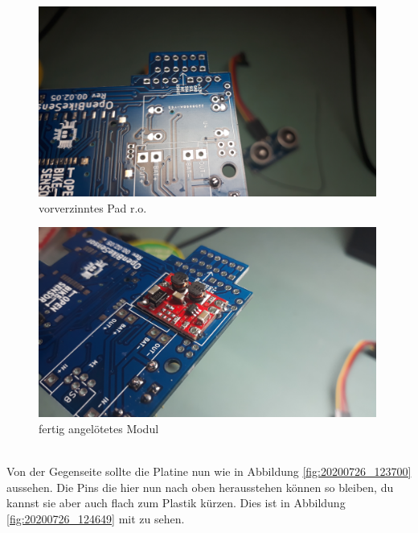 \documentclass[12pt, a4paper]{article}		%
\begin{document}
\begin{minipage}[t]{0.49\textwidth}
\begin{figure}[H]
	\centering
		\includegraphics[width=0.99\textwidth]{Grafiken/20200902_191734.jpg}
	\caption{vorverzinntes Pad r.o.}
	\label{fig:20200726_121444}
\end{figure}
\end{minipage}
\begin{minipage}[t]{0.49\textwidth}
\begin{figure}[H]
	\centering
		\includegraphics[width=0.99\textwidth]{Grafiken/20200902_191918.jpg}
	\caption{fertig angelötetes Modul}
	\label{fig:20200726_121444}
\end{figure}
\end{minipage}
\\ \newline
\newpage
Von der Gegenseite sollte die Platine nun wie in Abbildung \ref{fig:20200726_123700} aussehen. Die Pins die hier nun nach oben herausstehen können so bleiben, du kannst sie aber auch flach zum Plastik kürzen. Dies ist in Abbildung \ref{fig:20200726_124649} mit zu sehen.
\end{document}
